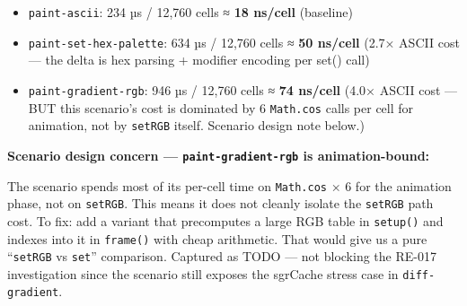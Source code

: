 \begin{itemize}
\tightlist
\item
  \texttt{p\allowbreak{}a\allowbreak{}i\allowbreak{}n\allowbreak{}t\allowbreak{}-\allowbreak{}a\allowbreak{}s\allowbreak{}c\allowbreak{}i\allowbreak{}i}: 234 µs / 12,760 cells ≈ \textbf{18 ns/cell} (baseline)
\item
  \texttt{p\allowbreak{}a\allowbreak{}i\allowbreak{}n\allowbreak{}t\allowbreak{}-\allowbreak{}s\allowbreak{}e\allowbreak{}t\allowbreak{}-\allowbreak{}h\allowbreak{}e\allowbreak{}x\allowbreak{}-\allowbreak{}p\allowbreak{}a\allowbreak{}l\allowbreak{}e\allowbreak{}t\allowbreak{}t\allowbreak{}e}: 634 µs / 12,760 cells ≈ \textbf{50 ns/cell} (2.7× ASCII cost --- the delta is hex parsing + modifier encoding per set() call)
\item
  \texttt{p\allowbreak{}a\allowbreak{}i\allowbreak{}n\allowbreak{}t\allowbreak{}-\allowbreak{}g\allowbreak{}r\allowbreak{}a\allowbreak{}d\allowbreak{}i\allowbreak{}e\allowbreak{}n\allowbreak{}t\allowbreak{}-\allowbreak{}r\allowbreak{}g\allowbreak{}b}: 946 µs / 12,760 cells ≈ \textbf{74 ns/cell} (4.0× ASCII cost --- BUT this scenario's cost is dominated by 6 \texttt{M\allowbreak{}a\allowbreak{}t\allowbreak{}h\allowbreak{}.\allowbreak{}c\allowbreak{}o\allowbreak{}s} calls per cell for animation, not by \texttt{s\allowbreak{}e\allowbreak{}t\allowbreak{}R\allowbreak{}G\allowbreak{}B} itself. Scenario design note below.)
\end{itemize}

\textbf{Scenario design concern --- \texttt{p\allowbreak{}a\allowbreak{}i\allowbreak{}n\allowbreak{}t\allowbreak{}-\allowbreak{}g\allowbreak{}r\allowbreak{}a\allowbreak{}d\allowbreak{}i\allowbreak{}e\allowbreak{}n\allowbreak{}t\allowbreak{}-\allowbreak{}r\allowbreak{}g\allowbreak{}b} is animation-bound:}

The scenario spends most of its per-cell time on \texttt{M\allowbreak{}a\allowbreak{}t\allowbreak{}h\allowbreak{}.\allowbreak{}c\allowbreak{}o\allowbreak{}s} × 6 for the animation phase, not on \texttt{s\allowbreak{}e\allowbreak{}t\allowbreak{}R\allowbreak{}G\allowbreak{}B}. This means it does not cleanly isolate the \texttt{s\allowbreak{}e\allowbreak{}t\allowbreak{}R\allowbreak{}G\allowbreak{}B} path cost. To fix: add a variant that precomputes a large RGB table in \texttt{s\allowbreak{}e\allowbreak{}t\allowbreak{}u\allowbreak{}p\allowbreak{}(\allowbreak{})} and indexes into it in \texttt{f\allowbreak{}r\allowbreak{}a\allowbreak{}m\allowbreak{}e\allowbreak{}(\allowbreak{})} with cheap arithmetic. That would give us a pure ``\texttt{s\allowbreak{}e\allowbreak{}t\allowbreak{}R\allowbreak{}G\allowbreak{}B} vs \texttt{s\allowbreak{}e\allowbreak{}t}'' comparison. Captured as TODO --- not blocking the RE-017 investigation since the scenario still exposes the sgrCache stress case in \texttt{d\allowbreak{}i\allowbreak{}f\allowbreak{}f\allowbreak{}-\allowbreak{}g\allowbreak{}r\allowbreak{}a\allowbreak{}d\allowbreak{}i\allowbreak{}e\allowbreak{}n\allowbreak{}t}.

